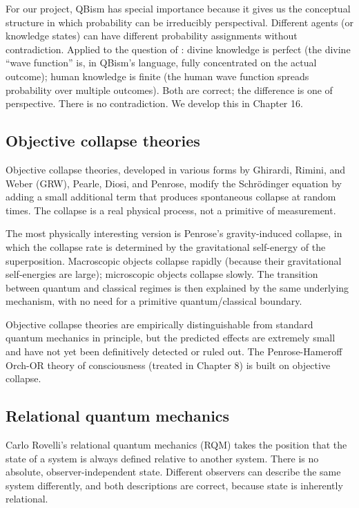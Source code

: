 For our project, QBism has special importance because it gives us
the conceptual structure in which probability can be irreducibly
perspectival. Different agents (or knowledge states) can have
different probability assignments without contradiction. Applied to
the question of : divine knowledge is perfect (the divine
``wave function'' is, in QBism's language, fully concentrated on
the actual outcome); human knowledge is finite (the human wave
function spreads probability over multiple outcomes). Both are
correct; the difference is one of perspective. There is no
contradiction. We develop this in Chapter 16.

\subsection{Objective collapse theories}

Objective collapse theories, developed in various forms by
Ghirardi, Rimini, and Weber (GRW), Pearle, Diosi, and Penrose,
modify the Schr\"odinger equation by adding a small additional term
that produces spontaneous collapse at random times. The collapse is
a real physical process, not a primitive of measurement.

The most physically interesting version is Penrose's gravity-induced
collapse, in which the collapse rate is determined by the
gravitational self-energy of the superposition. Macroscopic objects
collapse rapidly (because their gravitational self-energies are
large); microscopic objects collapse slowly. The transition between
quantum and classical regimes is then explained by the same
underlying mechanism, with no need for a primitive
quantum/classical boundary.

Objective collapse theories are empirically distinguishable from
standard quantum mechanics in principle, but the predicted effects
are extremely small and have not yet been definitively detected or
ruled out. The Penrose-Hameroff Orch-OR theory of consciousness
(treated in Chapter 8) is built on objective collapse.

\subsection{Relational quantum mechanics}

Carlo Rovelli's relational quantum mechanics (RQM) takes the
position that the state of a system is always defined relative to
another system. There is no absolute, observer-independent state.
Different observers can describe the same system differently, and
both descriptions are correct, because state is inherently
relational.

